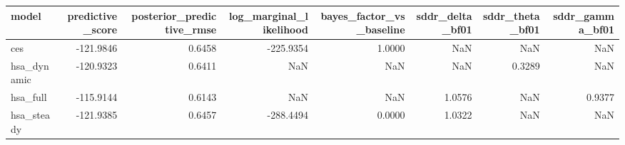 \begin{tabular}{lrrrrrrr}
\toprule
model & predictive\_score & posterior\_predictive\_rmse & log\_marginal\_likelihood & bayes\_factor\_vs\_baseline & sddr\_delta\_bf01 & sddr\_theta\_bf01 & sddr\_gamma\_bf01 \\
\midrule
ces & -121.9846 & 0.6458 & -225.9354 & 1.0000 & NaN & NaN & NaN \\
hsa\_dynamic & -120.9323 & 0.6411 & NaN & NaN & NaN & 0.3289 & NaN \\
hsa\_full & -115.9144 & 0.6143 & NaN & NaN & 1.0576 & NaN & 0.9377 \\
hsa\_steady & -121.9385 & 0.6457 & -288.4494 & 0.0000 & 1.0322 & NaN & NaN \\
\bottomrule
\end{tabular}
